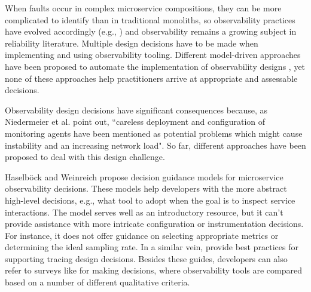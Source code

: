













When faults occur in complex microservice compositions, they can be more complicated to identify than in traditional monoliths, so observability practices have evolved accordingly (e.g., \cite{2010_Sigelman_Dapper,Li_ServiceMesh_2019,Kaldor_Canopy_2017}) and observability remains a growing subject in reliability literature. Multiple design decisions have to be made when implementing and using observability tooling. Different model-driven approaches have been proposed to automate the implementation of observability designs  \cite{Klein_ModelDrivenObservability_2016,Phipathananunth_SyntheticModelBasedMonitroingMicroservices_2018}, yet none of these approaches help practitioners arrive at appropriate and assessable decisions.

Observability design decisions have significant consequences because, as Niedermeier et al. \cite{Niedermaier_ObservabilityInterviewStudy_2019} point out, ``careless deployment and configuration of monitoring agents have been mentioned as potential problems which might cause instability and an increasing network load". So far, different approaches have been proposed to deal with this design challenge.

Haselböck and Weinreich \cite{Haselboeck_DecisionModelMicroservices_2017} propose decision guidance models for microservice observability decisions. These models help developers with the more abstract high-level decisions, e.g., what tool to adopt when the goal is to inspect service interactions. The model serves well as an introductory resource, but it can't provide assistance with more intricate configuration or instrumentation decisions. For instance, it does not offer guidance on selecting appropriate metrics or determining the ideal sampling rate. In a similar vein, \cite{Sambasivan_TracingDesignChoices_2016} provide best practices for supporting tracing design decisions. Besides these guides, developers can also refer to surveys like \cite{Janes_TracingQualitativeAnalysis_2022} for making decisions, where observability tools are compared based on a number of different qualitative criteria. 

